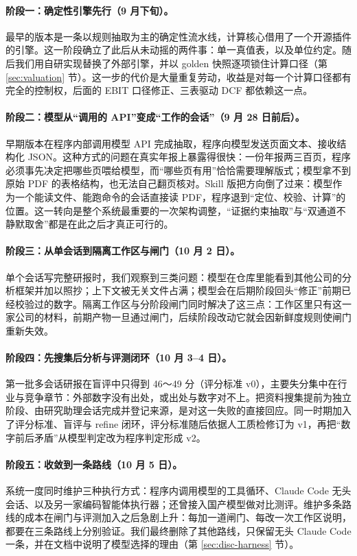 \paragraph{阶段一：确定性引擎先行（9 月下旬）。}最早的版本是一条以规则抽取为主的确定性流水线，计算核心借用了一个开源插件的引擎。这一阶段确立了此后从未动摇的两件事：单一真值表，以及单位约定。随后我们用自研实现替换了外部引擎，并以 golden 快照逐项锁住计算口径（第 \ref{sec:valuation} 节）。这一步的代价是大量重复劳动，收益是对每一个计算口径都有完全的控制权，后面的 EBIT 口径修正、三表驱动 DCF 都依赖这一点。

\paragraph{阶段二：模型从“调用的 API”变成“工作的会话”（9 月 28 日前后）。}早期版本在程序内部调用模型 API 完成抽取，程序向模型发送页面文本、接收结构化 JSON。这种方式的问题在真实年报上暴露得很快：一份年报两三百页，程序必须事先决定把哪些页喂给模型，而“哪些页有用”恰恰需要理解版式；模型拿不到原始 PDF 的表格结构，也无法自己翻页核对。Skill 版把方向倒了过来：模型作为一个能读文件、能跑命令的会话直接读 PDF，程序退到“定位、校验、计算”的位置。这一转向是整个系统最重要的一次架构调整，“证据约束抽取”与“双通道不静默取舍”都是在此之后才真正可行的。

\paragraph{阶段三：从单会话到隔离工作区与闸门（10 月 2 日）。}单个会话写完整研报时，我们观察到三类问题：模型在仓库里能看到其他公司的分析框架并加以照抄；上下文被无关文件占满；模型会在后期阶段回头“修正”前期已经校验过的数字。隔离工作区与分阶段闸门同时解决了这三点：工作区里只有这一家公司的材料，前期产物一旦通过闸门，后续阶段改动它就会因新鲜度规则使闸门重新失效。

\paragraph{阶段四：先搜集后分析与评测闭环（10 月 3--4 日）。}第一批多会话研报在盲评中只得到 46～49 分（评分标准 v0），主要失分集中在行业与竞争章节：外部数字没有出处，或出处与数字对不上。把资料搜集提前为独立阶段、由研究助理会话完成并登记来源，是对这一失败的直接回应。同一时期加入了评分标准、盲评与 refine 闭环，评分标准随后依据人工质检修订为 v1，再把“数字前后矛盾”从模型判定改为程序判定形成 v2。

\paragraph{阶段五：收敛到一条路线（10 月 5 日）。}系统一度同时维护三种执行方式：程序内调用模型的工具循环、Claude Code 无头会话、以及另一家编码智能体执行器；还曾接入国产模型做对比测评。维护多条路线的成本在闸门与评测加入之后急剧上升：每加一道闸门、每改一次工作区说明，都要在三条路线上分别验证。我们最终删除了其他路线，只保留无头 Claude Code 一条，并在文档中说明了模型选择的理由（第 \ref{sec:disc-harness} 节）。

